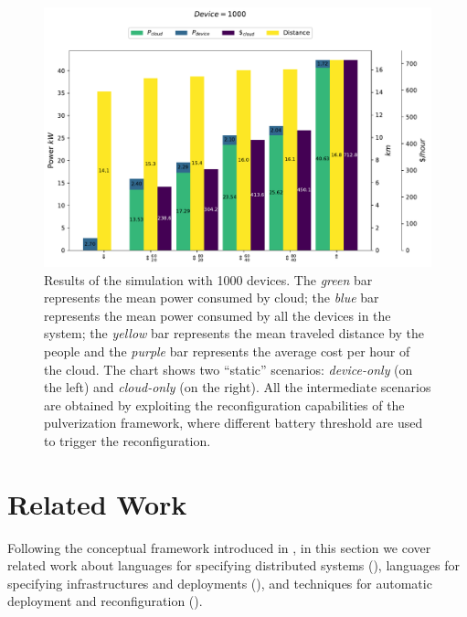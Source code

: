 \documentclass[conference]{IEEEtran}
\begin{document}
\begin{figure}[ht]
    \begin{minipage}{\columnwidth}
        \includegraphics[width=\linewidth]{figures/cloud_cost-device_consumption-cloud_consumption-distance-device=1000.0.pdf}
    \end{minipage}
    \caption{
        Results of the simulation with 1000 devices.
        The \emph{green} bar represents the mean power consumed by cloud;
        the \emph{blue} bar represents the mean power consumed by all the devices in the system;
        the \emph{yellow} bar represents the mean traveled distance by the people
        and the \emph{purple} bar represents the average cost per hour of the cloud.
        The chart shows two ``static'' scenarios: \emph{device-only} (on the left) and \emph{cloud-only} (on the right).
        All the intermediate scenarios are obtained by exploiting the reconfiguration capabilities of the pulverization framework,
        where different battery threshold are used to trigger the reconfiguration.
    }
    \label{fig:result-1000-devices}
\end{figure}




\section{Related Work}
\label{sec:rw}

%
Following the conceptual framework introduced in ,
 in this section we cover related work about
 languages for 
 specifying distributed systems (),
 languages for specifying infrastructures and deployments (),
 and
 techniques for automatic deployment and reconfiguration ().
 
\end{document}
